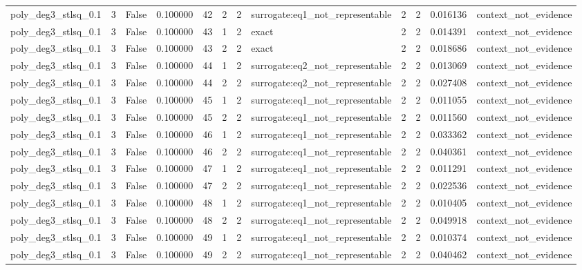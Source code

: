 \begin{tabular}{lrrrrrrlrrrl}
poly\_deg3\_stlsq\_0.1 & 3 & False & 0.100000 & 42 & 2 & 2 & surrogate:eq1\_not\_representable & 2 & 2 & 0.016136 & context\_not\_evidence \\
poly\_deg3\_stlsq\_0.1 & 3 & False & 0.100000 & 43 & 1 & 2 & exact & 2 & 2 & 0.014391 & context\_not\_evidence \\
poly\_deg3\_stlsq\_0.1 & 3 & False & 0.100000 & 43 & 2 & 2 & exact & 2 & 2 & 0.018686 & context\_not\_evidence \\
poly\_deg3\_stlsq\_0.1 & 3 & False & 0.100000 & 44 & 1 & 2 & surrogate:eq2\_not\_representable & 2 & 2 & 0.013069 & context\_not\_evidence \\
poly\_deg3\_stlsq\_0.1 & 3 & False & 0.100000 & 44 & 2 & 2 & surrogate:eq2\_not\_representable & 2 & 2 & 0.027408 & context\_not\_evidence \\
poly\_deg3\_stlsq\_0.1 & 3 & False & 0.100000 & 45 & 1 & 2 & surrogate:eq1\_not\_representable & 2 & 2 & 0.011055 & context\_not\_evidence \\
poly\_deg3\_stlsq\_0.1 & 3 & False & 0.100000 & 45 & 2 & 2 & surrogate:eq1\_not\_representable & 2 & 2 & 0.011560 & context\_not\_evidence \\
poly\_deg3\_stlsq\_0.1 & 3 & False & 0.100000 & 46 & 1 & 2 & surrogate:eq1\_not\_representable & 2 & 2 & 0.033362 & context\_not\_evidence \\
poly\_deg3\_stlsq\_0.1 & 3 & False & 0.100000 & 46 & 2 & 2 & surrogate:eq1\_not\_representable & 2 & 2 & 0.040361 & context\_not\_evidence \\
poly\_deg3\_stlsq\_0.1 & 3 & False & 0.100000 & 47 & 1 & 2 & surrogate:eq1\_not\_representable & 2 & 2 & 0.011291 & context\_not\_evidence \\
poly\_deg3\_stlsq\_0.1 & 3 & False & 0.100000 & 47 & 2 & 2 & surrogate:eq1\_not\_representable & 2 & 2 & 0.022536 & context\_not\_evidence \\
poly\_deg3\_stlsq\_0.1 & 3 & False & 0.100000 & 48 & 1 & 2 & surrogate:eq1\_not\_representable & 2 & 2 & 0.010405 & context\_not\_evidence \\
poly\_deg3\_stlsq\_0.1 & 3 & False & 0.100000 & 48 & 2 & 2 & surrogate:eq1\_not\_representable & 2 & 2 & 0.049918 & context\_not\_evidence \\
poly\_deg3\_stlsq\_0.1 & 3 & False & 0.100000 & 49 & 1 & 2 & surrogate:eq1\_not\_representable & 2 & 2 & 0.010374 & context\_not\_evidence \\
poly\_deg3\_stlsq\_0.1 & 3 & False & 0.100000 & 49 & 2 & 2 & surrogate:eq1\_not\_representable & 2 & 2 & 0.040462 & context\_not\_evidence \\

\end{tabular}
